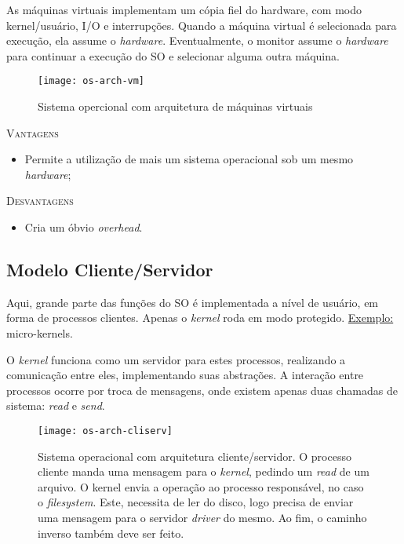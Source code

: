 As máquinas virtuais implementam um cópia fiel do hardware, com modo kernel/usuário, I/O e interrupções. Quando a máquina virtual é selecionada para execução, ela assume o \textit{hardware}. Eventualmente, o monitor assume o \textit{hardware} para continuar a execução do SO e selecionar alguma outra máquina.


\begin{figure}[ht]
  \centering
  \texttt{[image: os-arch-vm]}
  \caption{Sistema opercional com arquitetura de máquinas virtuais}
  \label{fig:os-arch-vm}
\end{figure}



\textsc{Vantagens}
\begin{itemize}
  \item Permite a utilização de mais um sistema operacional sob um mesmo \textit{hardware};
\end{itemize}

\textsc{Desvantagens}
\begin{itemize}
  \item Cria um óbvio \textit{overhead}.
\end{itemize}






\subsection{Modelo Cliente/Servidor}
Aqui, grande parte das funções do SO é implementada a nível de usuário, em forma de processos clientes. Apenas o \textit{kernel} roda em modo protegido.
\underline{Exemplo:} micro-kernels.

O \textit{kernel} funciona como um servidor para estes processos, realizando a comunicação entre eles, implementando suas abstrações. A interação entre processos ocorre por troca de mensagens, onde existem apenas duas chamadas de sistema: \textit{read} e \textit{send}.

\begin{figure}[ht]
  \centering
  \texttt{[image: os-arch-cliserv]}
  \caption{Sistema operacional com arquitetura cliente/servidor. O processo cliente manda uma mensagem para o \textit{kernel}, pedindo um \textit{read} de um arquivo. O kernel envia a operação ao processo responsável, no caso o \textit{filesystem}. Este, necessita de ler do disco, logo precisa de enviar uma mensagem para o servidor \textit{driver} do mesmo. Ao fim, o caminho inverso também deve ser feito.}
  \label{fig:os-arch-cliserv}
\end{figure}


